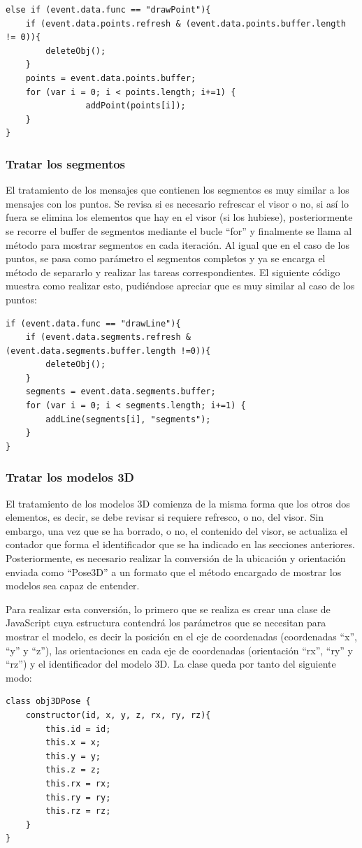 \begin{lstlisting}[frame=single]
else if (event.data.func == "drawPoint"){
	if (event.data.points.refresh & (event.data.points.buffer.length != 0)){
		deleteObj();
	}
	points = event.data.points.buffer;
	for (var i = 0; i < points.length; i+=1) {
        		addPoint(points[i]);
	}
}
\end{lstlisting}

\subsubsection{Tratar los segmentos}
El tratamiento de los mensajes que contienen los segmentos es muy similar a los mensajes con los puntos. Se revisa si es necesario refrescar el visor o no, si así lo fuera se elimina los elementos que hay en el visor (si los hubiese), posteriormente se recorre el buffer de segmentos mediante el bucle ``for'' y finalmente se llama al método para mostrar segmentos en cada iteración. Al igual que en el caso de los puntos, se pasa como parámetro el segmentos completos y ya se encarga el método de separarlo y realizar las tareas correspondientes. El siguiente código muestra como realizar esto, pudiéndose apreciar que es muy similar al caso de los puntos:

\begin{lstlisting}[frame=single]
if (event.data.func == "drawLine"){
	if (event.data.segments.refresh & (event.data.segments.buffer.length !=0)){
		deleteObj();
	}
	segments = event.data.segments.buffer;
	for (var i = 0; i < segments.length; i+=1) {
		addLine(segments[i], "segments");
	}
}
\end{lstlisting}

\subsubsection{Tratar los modelos 3D}
El tratamiento de los modelos 3D comienza de la misma forma que los otros dos elementos, es decir, se debe revisar si requiere refresco, o no, del visor. Sin embargo, una vez que se ha borrado, o no, el contenido del visor, se actualiza el contador que forma el identificador que se ha indicado en las secciones anteriores. Posteriormente, es necesario realizar la conversión de la ubicación y orientación enviada como ``Pose3D'' a un formato que el método encargado de mostrar los modelos sea capaz de entender.

Para realizar esta conversión, lo primero que se realiza es crear una clase de JavaScript cuya estructura contendrá los parámetros que se necesitan para mostrar el modelo, es decir la posición en el eje de coordenadas (coordenadas ``x'', ``y'' y ``z''), las orientaciones en cada eje de coordenadas (orientación ``rx'', ``ry'' y ``rz'') y el identificador del modelo 3D. La clase queda por tanto del siguiente modo:
\begin{lstlisting}[frame=single]
class obj3DPose {
	constructor(id, x, y, z, rx, ry, rz){
		this.id = id;
		this.x = x;
		this.y = y;
		this.z = z;
		this.rx = rx;
		this.ry = ry;
		this.rz = rz;
	}
}
\end{lstlisting}

